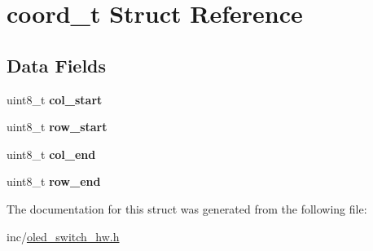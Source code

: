 \hypertarget{structcoord__t}{}\section{coord\+\_\+t Struct Reference}
\label{structcoord__t}
\subsection*{Data Fields}
\begin{DoxyCompactItemize}
\item 
\hypertarget{structcoord__t_a2ee3105d3bc8ba24bab7c2327a63b8a3}{}uint8\+\_\+t {\bfseries col\+\_\+start}\label{structcoord__t_a2ee3105d3bc8ba24bab7c2327a63b8a3}

\item 
\hypertarget{structcoord__t_a535f79016a227dafa8949c086a6e1250}{}uint8\+\_\+t {\bfseries row\+\_\+start}\label{structcoord__t_a535f79016a227dafa8949c086a6e1250}

\item 
\hypertarget{structcoord__t_ae5ebbd1274749f38fc516c1bff3794ea}{}uint8\+\_\+t {\bfseries col\+\_\+end}\label{structcoord__t_ae5ebbd1274749f38fc516c1bff3794ea}

\item 
\hypertarget{structcoord__t_a82d9975db701c5417bfa89d78a1936dc}{}uint8\+\_\+t {\bfseries row\+\_\+end}\label{structcoord__t_a82d9975db701c5417bfa89d78a1936dc}

\end{DoxyCompactItemize}


The documentation for this struct was generated from the following file\+:\begin{DoxyCompactItemize}
\item 
inc/\hyperlink{oled__switch__hw_8h}{oled\+\_\+switch\+\_\+hw.\+h}\end{DoxyCompactItemize}
